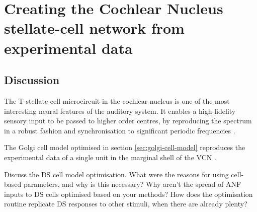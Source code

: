 \documentclass[11pt,a4paper,twoside]{book} %
\begin{document}

\setcounter{chapter}{2}
\chapter[Simple Responses]{Creating the Cochlear Nucleus stellate-cell network from experimental data}
\label{sec:SimpleResponsesChapter}



\newpage

\newpage

\newpage

\newpage
% 
\newpage

\section{Discussion}

  The T-stellate cell microcircuit in the
cochlear nucleus is one of the most interesting neural features of the
auditory system.  It enables a high-fidelity sensory input to be
passed to higher order centres, by reproducing the spectrum in a
robust fashion \citep{BlackburnSachs:1990,May:2003} and
synchronisation to significant periodic frequencies
\citep{KeilsonRichardsEtAl:1997}.

\medskip{} 

  The Golgi cell model optimised in section
\ref{sec:golgi-cell-model} reproduces the experimental data of a
single unit in the marginal shell of the VCN \citep{GhoshalKim:1997}.

\medskip{}

Discuss the DS cell model optimisation.  What were the reasons for
using cell-based parameters, and why is this necessary?  Why aren't
the spread of ANF inputs to DS cells optimised based on your methods?
How does the optimisation routine replicate DS responses to other
stimuli, when there are already plenty?
\end{document}
